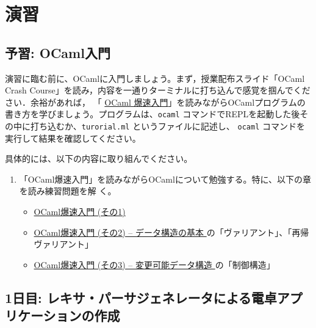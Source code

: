 \documentclass[a4paper,11pt]{jsarticle}
\begin{document}


\newpage
\section{演習}

\subsection{予習: OCaml入門}

演習に臨む前に、OCamlに入門しましょう。まず，授業配布スライド「OCaml Crash Course」を読み，内容を一通りターミナルに打ち込んで感覚を掴んでください．余裕があれば，
「
\href{https://www.fos.kuis.kyoto-u.ac.jp/~igarashi/class/pl/03-ocaml.html#quick-intro-ocaml}{OCaml
  爆速入門}」を読みながらOCamlプログラムの書き方を学びましょう。プログラムは、\verb|ocaml|
コマンドでREPLを起動した後その中に打ち込むか、\verb|turorial.ml| というファイルに記述し、
\verb|ocaml| コマンドを実行して結果を確認してください。

具体的には、以下の内容に取り組んでください。

\begin{enumerate}
\item 「OCaml爆速入門」を読みながらOCamlについて勉強する。特に、以下の章を読み練習問題を解
  く。
  \begin{itemize}
  \item
    \href{https://www.fos.kuis.kyoto-u.ac.jp/~igarashi/class/pl/03-ocaml.html#quick-intro-ocaml}{
      OCaml爆速入門 (その1)}
  \item
    \href{https://www.fos.kuis.kyoto-u.ac.jp/~igarashi/class/pl/03-ocaml.html#quick-intro-ocaml2}{
      OCaml爆速入門 (その2) -- データ構造の基本
    } の「ヴァリアント」、「再帰ヴァリアント」
  \item
    \href{https://www.fos.kuis.kyoto-u.ac.jp/~igarashi/class/pl/03-ocaml.html#quick-intro-ocaml2}{
      OCaml爆速入門 (その3) -- 変更可能データ構造
    } の「制御構造」
  \end{itemize}
\end{enumerate}

\subsection{1日目: レキサ・パーサジェネレータによる電卓アプリケーションの作成}
\end{document}
